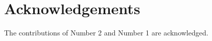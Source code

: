 \chapter*{\vspace{-80pt}\centering \large Acknowledgements \vspace{-35pt}}%

The contributions of Number 2 and Number 1 are acknowledged.
